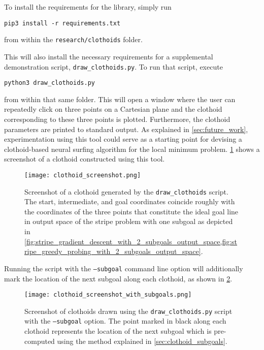 To install the requirements for the library, simply run
\begin{verbatim}
pip3 install -r requirements.txt
\end{verbatim}
from within the \texttt{research/clothoids} folder.

This will also install the necessary requirements for a supplemental demonstration script, \texttt{draw\_clothoids.py}.
To run that script, execute 
\begin{verbatim}
python3 draw_clothoids.py
\end{verbatim}
from within that same folder.
This will open a window where the user can repeatedly click on three points on a Cartesian plane and the clothoid corresponding to these three points is plotted.
Furthermore, the clothoid parameters are printed to standard output.
As explained in \ref{sec:future_work}, experimentation using this tool could serve as a starting point for devising a clothoid-based neural surfing algorithm for the local minimum problem.
\ref{fig:clothoid_screenshot} shows a screenshot of a clothoid constructed using this tool. 
\begin{figure}
  \centering
  \texttt{[image: clothoid\_screenshot.png]}
  \caption{Screenshot of a clothoid generated by the \texttt{draw\_clothoids} script. The start, intermediate, and goal coordinates coincide roughly with the coordinates of the three points that constitute the ideal goal line in output space of the stripe problem with one subgoal as depicted in \ref{fig:stripe_gradient_descent_with_2_subgoals_output_space,fig:stripe_greedy_probing_with_2_subgoals_output_space}.}
  \label{fig:clothoid_screenshot}
\end{figure}

Running the script with the \texttt{--subgoal} command line option will additionally mark the location of the next subgoal along each clothoid, as shown in \ref{fig:clothoid_screenshot_with_subgoals}.
\begin{figure}
  \centering
  \texttt{[image: clothoid\_screenshot\_with\_subgoals.png]}
  \caption{Screenshot of clothoids drawn using the \texttt{draw\_clothoids.py} script with the \texttt{--subgoal} option. The point marked in black along each clothoid represents the location of the next subgoal which is pre-computed using the method explained in \ref{sec:clothoid_subgoals}.}
  \label{fig:clothoid_screenshot_with_subgoals}
\end{figure}